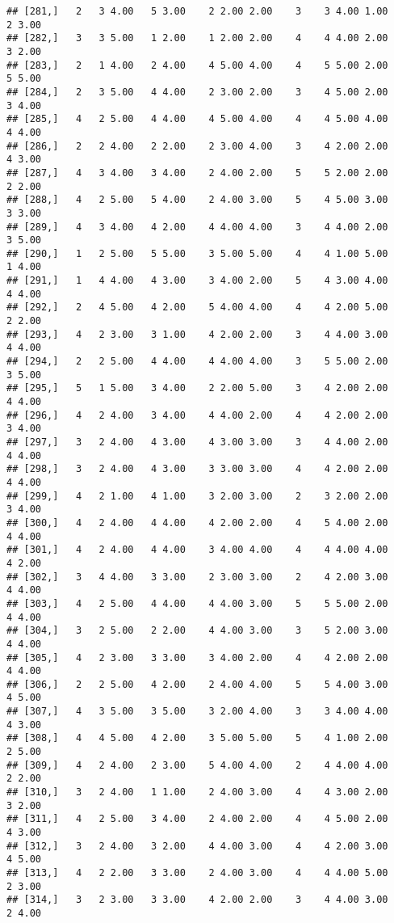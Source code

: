 \documentclass[]{article}
\begin{document}
\begin{verbatim}
## [281,]   2   3 4.00   5 3.00    2 2.00 2.00    3    3 4.00 1.00    2 3.00
## [282,]   3   3 5.00   1 2.00    1 2.00 2.00    4    4 4.00 2.00    3 2.00
## [283,]   2   1 4.00   2 4.00    4 5.00 4.00    4    5 5.00 2.00    5 5.00
## [284,]   2   3 5.00   4 4.00    2 3.00 2.00    3    4 5.00 2.00    3 4.00
## [285,]   4   2 5.00   4 4.00    4 5.00 4.00    4    4 5.00 4.00    4 4.00
## [286,]   2   2 4.00   2 2.00    2 3.00 4.00    3    4 2.00 2.00    4 3.00
## [287,]   4   3 4.00   3 4.00    2 4.00 2.00    5    5 2.00 2.00    2 2.00
## [288,]   4   2 5.00   5 4.00    2 4.00 3.00    5    4 5.00 3.00    3 3.00
## [289,]   4   3 4.00   4 2.00    4 4.00 4.00    3    4 4.00 2.00    3 5.00
## [290,]   1   2 5.00   5 5.00    3 5.00 5.00    4    4 1.00 5.00    1 4.00
## [291,]   1   4 4.00   4 3.00    3 4.00 2.00    5    4 3.00 4.00    4 4.00
## [292,]   2   4 5.00   4 2.00    5 4.00 4.00    4    4 2.00 5.00    2 2.00
## [293,]   4   2 3.00   3 1.00    4 2.00 2.00    3    4 4.00 3.00    4 4.00
## [294,]   2   2 5.00   4 4.00    4 4.00 4.00    3    5 5.00 2.00    3 5.00
## [295,]   5   1 5.00   3 4.00    2 2.00 5.00    3    4 2.00 2.00    4 4.00
## [296,]   4   2 4.00   3 4.00    4 4.00 2.00    4    4 2.00 2.00    3 4.00
## [297,]   3   2 4.00   4 3.00    4 3.00 3.00    3    4 4.00 2.00    4 4.00
## [298,]   3   2 4.00   4 3.00    3 3.00 3.00    4    4 2.00 2.00    4 4.00
## [299,]   4   2 1.00   4 1.00    3 2.00 3.00    2    3 2.00 2.00    3 4.00
## [300,]   4   2 4.00   4 4.00    4 2.00 2.00    4    5 4.00 2.00    4 4.00
## [301,]   4   2 4.00   4 4.00    3 4.00 4.00    4    4 4.00 4.00    4 2.00
## [302,]   3   4 4.00   3 3.00    2 3.00 3.00    2    4 2.00 3.00    4 4.00
## [303,]   4   2 5.00   4 4.00    4 4.00 3.00    5    5 5.00 2.00    4 4.00
## [304,]   3   2 5.00   2 2.00    4 4.00 3.00    3    5 2.00 3.00    4 4.00
## [305,]   4   2 3.00   3 3.00    3 4.00 2.00    4    4 2.00 2.00    4 4.00
## [306,]   2   2 5.00   4 2.00    2 4.00 4.00    5    5 4.00 3.00    4 5.00
## [307,]   4   3 5.00   3 5.00    3 2.00 4.00    3    3 4.00 4.00    4 3.00
## [308,]   4   4 5.00   4 2.00    3 5.00 5.00    5    4 1.00 2.00    2 5.00
## [309,]   4   2 4.00   2 3.00    5 4.00 4.00    2    4 4.00 4.00    2 2.00
## [310,]   3   2 4.00   1 1.00    2 4.00 3.00    4    4 3.00 2.00    3 2.00
## [311,]   4   2 5.00   3 4.00    2 4.00 2.00    4    4 5.00 2.00    4 3.00
## [312,]   3   2 4.00   3 2.00    4 4.00 3.00    4    4 2.00 3.00    4 5.00
## [313,]   4   2 2.00   3 3.00    2 4.00 3.00    4    4 4.00 5.00    2 3.00
## [314,]   3   2 3.00   3 3.00    4 2.00 2.00    3    4 4.00 3.00    2 4.00

\end{verbatim}
\end{document}
